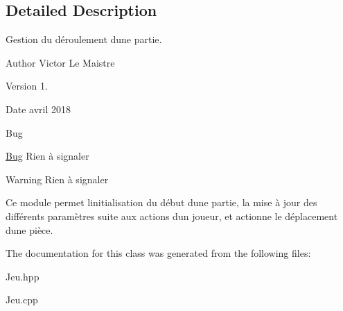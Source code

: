 \subsection{Detailed Description}
Gestion du déroulement d\textquotesingle{}une partie. 

\begin{DoxyAuthor}{Author}
Victor Le Maistre 
\end{DoxyAuthor}
\begin{DoxyVersion}{Version}
1. 
\end{DoxyVersion}
\begin{DoxyDate}{Date}
avril 2018 
\end{DoxyDate}
\begin{DoxyRefDesc}{Bug}
\item[\hyperlink{bug__bug000001}{Bug}]Rien à signaler \end{DoxyRefDesc}
\begin{DoxyWarning}{Warning}
Rien à signaler
\end{DoxyWarning}
Ce module permet l\textquotesingle{}initialisation du début d\textquotesingle{}une partie, la mise à jour des différents paramètres suite aux actions d\textquotesingle{}un joueur, et actionne le déplacement d\textquotesingle{}une pièce. 

The documentation for this class was generated from the following files\+:\begin{DoxyCompactItemize}
\item 
Jeu.\+hpp\item 
Jeu.\+cpp\end{DoxyCompactItemize}
